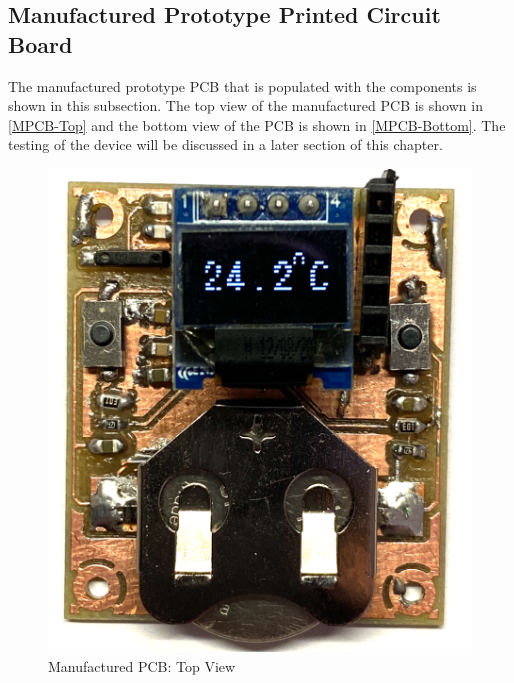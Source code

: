 \subsection{Manufactured Prototype Printed Circuit Board}
The manufactured prototype PCB that is populated with the components is shown in this subsection. The top view of the manufactured PCB is shown in \autoref{MPCB-Top} and the bottom view of the PCB is shown in \autoref{MPCB-Bottom}. The testing of the device will be discussed in a later section of this chapter.
\begin{figure}[H]
	\centering
	\includegraphics[scale=0.3]{img/MPCB-Top.PNG}
	\caption{Manufactured PCB: Top View}
	\label{MPCB-Top}
\end{figure}

